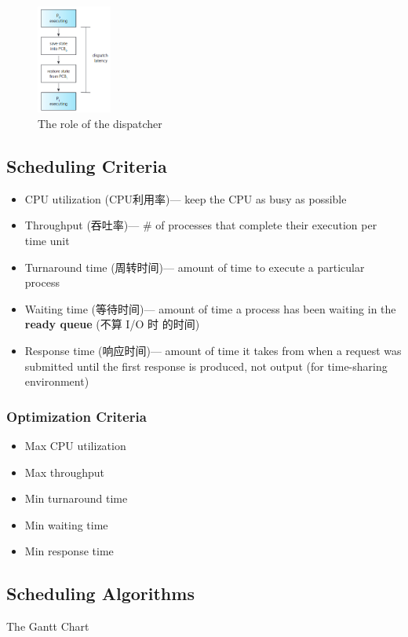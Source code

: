 \begin{figure}[!htb]
    \centering
    \includegraphics[width=0.22\textwidth]{pic/OS5/The role of the dispatcher}
    \caption{The role of the dispatcher}
\end{figure}

\subsection{Scheduling Criteria}
\begin{itemize}\small
    \item CPU utilization (CPU利用率)--- keep the CPU as busy as possible
    \item Throughput (吞吐率)--- \# of processes that complete their execution per time unit
    \item Turnaround time (周转时间)--- amount of time to execute a particular process
    \item Waiting time (等待时间)--- amount of time a process has been waiting in the \textbf{ready queue} (不算 I/O 时 的时间)
    \item Response time (响应时间)--- amount of time it takes from when a request was submitted until the first response is produced, not output (for time-sharing environment)
\end{itemize}

\subsubsection{Optimization Criteria} 
\begin{itemize}\small
    \item Max CPU utilization
    \item Max throughput
    \item Min turnaround time
    \item Min waiting time
    \item Min response time
\end{itemize}

\subsection{Scheduling Algorithms}
The Gantt Chart

